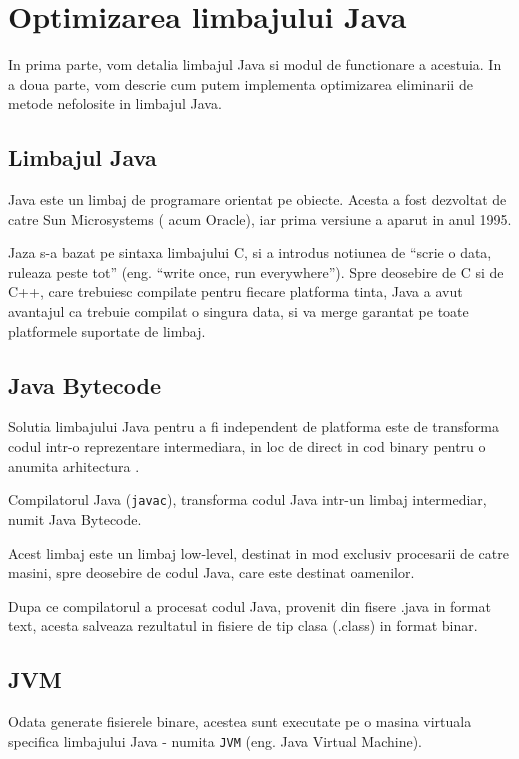 \chapter{Optimizarea limbajului Java}

In prima parte, vom detalia limbajul Java si modul de functionare
a acestuia.
In a doua parte, vom descrie cum putem implementa optimizarea
eliminarii de metode nefolosite in limbajul Java.

\section{Limbajul Java}

Java este un limbaj de programare orientat pe obiecte. Acesta a fost
dezvoltat de catre Sun Microsystems ( acum Oracle), iar prima versiune a
aparut in anul 1995.

Jaza s-a bazat pe sintaxa limbajului C, si a introdus notiunea de
``scrie o data, ruleaza peste tot'' (eng. ``write once, run
everywhere''). Spre deosebire de C si de C++, care trebuiesc compilate
pentru fiecare platforma tinta, Java a avut avantajul ca trebuie
compilat o singura data, si va merge garantat pe toate platformele
suportate de limbaj.

\section{Java Bytecode}

Solutia limbajului Java pentru a fi independent de platforma este de
transforma codul intr-o reprezentare intermediara, in loc de direct in
cod binary pentru o anumita arhitectura .

Compilatorul Java (\texttt{javac}), transforma codul Java intr-un limbaj
intermediar, numit Java Bytecode.

Acest limbaj este un limbaj low-level, destinat in mod exclusiv
procesarii de catre masini, spre deosebire de codul Java, care este
destinat oamenilor.

Dupa ce compilatorul a procesat codul Java, provenit din fisere .java in
format text, acesta salveaza rezultatul in fisiere de tip clasa (.class)
in format binar.

\section{JVM}

Odata generate fisierele binare, acestea sunt executate pe o masina
virtuala specifica limbajului Java - numita \texttt{JVM}
(eng. Java Virtual Machine).

